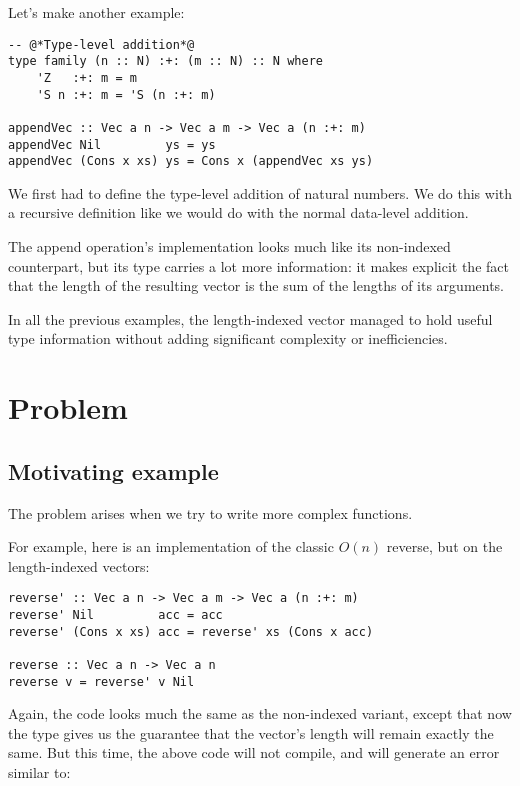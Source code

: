 Let's make another example:

\begin{lstlisting}[caption=Appending a \texttt{Vec} to another]
-- @*Type-level addition*@
type family (n :: N) :+: (m :: N) :: N where
    'Z   :+: m = m
    'S n :+: m = 'S (n :+: m)

appendVec :: Vec a n -> Vec a m -> Vec a (n :+: m)
appendVec Nil         ys = ys
appendVec (Cons x xs) ys = Cons x (appendVec xs ys)
\end{lstlisting}

We first had to define the type-level addition of natural numbers. We do this with a recursive definition like we would do with the normal data-level addition.

The append operation's implementation looks much like its non-indexed counterpart, but its type carries a lot more information: it makes explicit the fact that the length of the resulting vector is the sum of the lengths of its arguments.

In all the previous examples, the length-indexed vector managed to hold useful type information without adding significant complexity or inefficiencies.

\section{Problem}
\label{sec:problem}

\subsection{Motivating example}
\label{subsec:motivating-example}

The problem arises when we try to write more complex functions.

For example, here is an implementation of the classic $O(n)$ reverse, but on the length-indexed vectors:

\begin{lstlisting}
reverse' :: Vec a n -> Vec a m -> Vec a (n :+: m)
reverse' Nil         acc = acc
reverse' (Cons x xs) acc = reverse' xs (Cons x acc)

reverse :: Vec a n -> Vec a n
reverse v = reverse' v Nil
\end{lstlisting}

Again, the code looks much the same as the non-indexed variant, except that now the type gives us the guarantee that the vector's length will remain exactly the same.
But this time, the above code will not compile, and will generate an error similar to:

